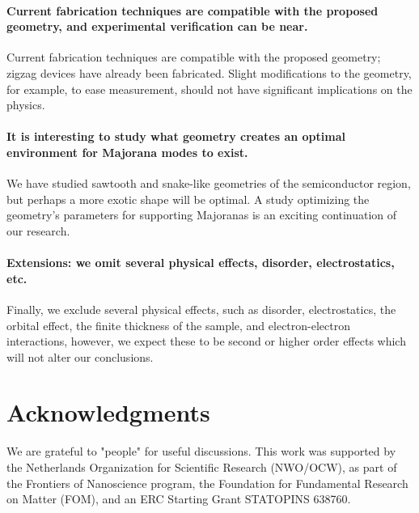 \documentclass[english, twocolumn, 10pt, aps, superscriptaddress, floatfix, prb, citeautoscript]{revtex4-1}
\renewcommand{\comment}[2]{#2}
\renewcommand{\comment}{\paragraph}
\begin{document}
\comment{Current fabrication techniques are compatible with the proposed geometry, and experimental verification can be near.}
Current fabrication techniques are compatible with the proposed geometry; zigzag devices have already been fabricated. %
Slight modifications to the geometry, for example, to ease measurement, should not have significant implications on the physics.

\comment{It is interesting to study what geometry creates an optimal environment for Majorana modes to exist.}
We have studied sawtooth and snake-like geometries of the semiconductor region, but perhaps a more exotic shape will be optimal.
A study optimizing the geometry's parameters for supporting Majoranas is an exciting continuation of our research.

\comment{Extensions: we omit several physical effects, disorder, electrostatics, etc.}
Finally, we exclude several physical effects, such as disorder, electrostatics, the orbital effect, the finite thickness of the sample, and electron-electron interactions, however, we expect these to be second or higher order effects which will not alter our conclusions.

\section{Acknowledgments}
We are grateful to "people" for useful discussions.
This work was supported by the Netherlands Organization for Scientific Research (NWO/OCW), as part of the Frontiers of Nanoscience program, the Foundation for Fundamental Research on Matter (FOM), and an ERC Starting Grant STATOPINS 638760.



\end{document}
